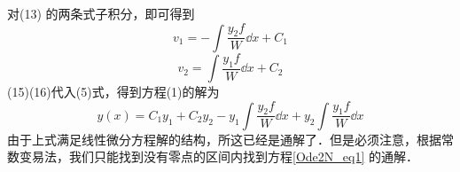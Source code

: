 对(13)%
的两条式子积分，即可得到
\begin{equation}
v_1 =  - \int \frac{y_2 f}{W} \dd{x}  + C_1
\end{equation}
\begin{equation}
v_2 = \int \frac{y_1 f}{W} \dd{x}  + C_2
\end{equation}
(15)(16)代入(5)式，得到方程(1)的解为 %
\begin{equation}
y(x) = C_1 y_1 + C_2 y_2 - y_1 \int \frac{y_2 f}{W} \dd{x} + y_2 \int \frac{y_1 f}{W} \dd{x}
\end{equation}
由于上式满足线性微分方程解的结构，所这已经是通解了．但是必须注意，根据常数变易法，我们只能找到没有零点的区间内找到方程\autoref{Ode2N_eq1} 的通解．

